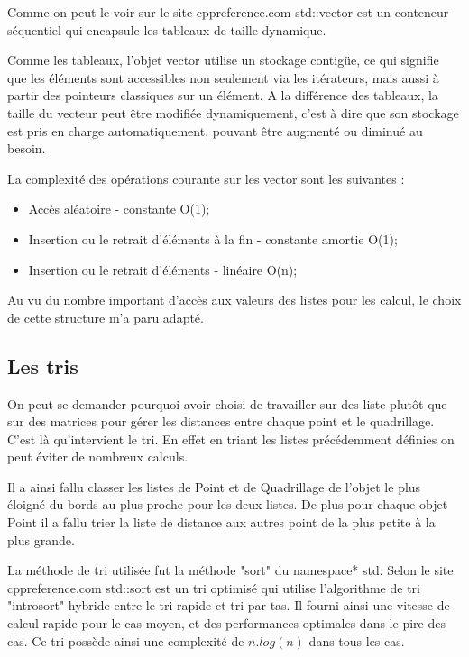 \documentclass[stage2a]{tnreport}
\begin{document}
Comme on peut le voir sur le site cppreference.com\cite{vector} std::vector est un conteneur séquentiel qui encapsule les tableaux de taille dynamique.

Comme les tableaux, l'objet vector utilise un stockage contigüe, ce qui signifie que les éléments sont accessibles non seulement via les itérateurs, mais aussi à partir des pointeurs classiques sur un élément. A la différence des tableaux, la taille du vecteur peut être modifiée dynamiquement, c'est à dire que son stockage est pris en charge automatiquement, pouvant être augmenté ou diminué au besoin.

La complexité des opérations courante sur les vector sont les suivantes :
\begin{itemize}
\item Accès aléatoire - constante O(1);
\item Insertion ou le retrait d'éléments à la fin - constante amortie O(1);
\item Insertion ou le retrait d'éléments - linéaire O(n);\\
\end{itemize}

Au vu du nombre important d'accès aux valeurs des listes pour les calcul, le choix de cette structure m'a paru adapté.

\subsection{Les tris}

On peut se demander pourquoi avoir choisi de travailler sur des liste plutôt que sur des matrices pour gérer les distances entre chaque point et le quadrillage. C'est là qu'intervient le tri. En effet en triant les listes précédemment définies on peut éviter de nombreux calculs.

Il a ainsi fallu classer les listes de Point et de Quadrillage de l'objet le plus éloigné du bords au plus proche pour les deux listes. De plus pour chaque objet Point il a fallu trier la liste de distance aux autres point de la plus petite à la plus grande.

La méthode de tri utilisée fut la méthode "sort" du \gls{namespace}* std. Selon le site cppreference.com\cite{sort} std::sort est un tri optimisé qui utilise l'algorithme de tri "introsort" hybride entre le tri rapide et tri par tas. Il fourni ainsi une vitesse de calcul rapide pour le cas moyen, et des performances optimales dans le pire des cas. Ce tri possède ainsi une complexité de \begin{math}n.log(n)\end{math} dans tous les cas.
\end{document}

